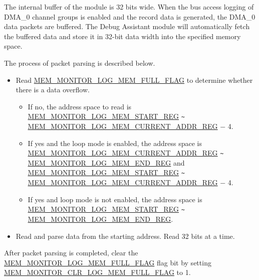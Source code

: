 \documentclass[main\_\_EN.tex]{subfiles}
\begin{document}
The internal buffer of the module is 32 bits wide. When the bus access logging of DMA\_0 channel groups is enabled and the record data is generated, the DMA\_0 data packets are buffered. The Debug Assistant module will automatically fetch the buffered data and store it in 32-bit data width into the specified memory space.

The process of packet parsing is described below.

\begin{itemize}
    \item Read \hyperref[fielddesc:MEMMONITORLOGMEMFULLFLAG]{MEM\_MONITOR\_LOG\_MEM\_FULL\_FLAG} to determine whether there is a data overflow.
    \begin{itemize} 
        \item If no, the address space to read is \hyperref[regdesc:MEMMONITORLOGMEMSTARTREG]{MEM\_MONITOR\_LOG\_MEM\_START\_REG}  \verb+~+ \hyperref[regdesc:MEMMONITORLOGMEMCURRENTADDRREG]{MEM\_MONITOR\_LOG\_MEM\_CURRENT\_ADDR\_REG} $-$ 4.
        \item If yes and the loop mode is enabled, the address space is \hyperref[regdesc:MEMMONITORLOGMEMCURRENTADDRREG]{MEM\_MONITOR\_LOG\_MEM\_CURRENT\_ADDR\_REG} \verb+~+ \hyperref[regdesc:MEMMONITORLOGMEMENDREG]{MEM\_MONITOR\_LOG\_MEM\_END\_REG} and \hyperref[regdesc:MEMMONITORLOGMEMSTARTREG]{MEM\_MONITOR\_LOG\_MEM\_START\_REG} \verb+~+ \hyperref[regdesc:MEMMONITORLOGMEMCURRENTADDRREG]{MEM\_MONITOR\_LOG\_MEM\_CURRENT\_ADDR\_REG} $-$ 4.
        \item If yes and loop mode is not enabled, the address space is \hyperref[regdesc:MEMMONITORLOGMEMSTARTREG]{MEM\_MONITOR\_LOG\_MEM\_START\_REG} \verb+~+ \hyperref[regdesc:MEMMONITORLOGMEMENDREG]{MEM\_MONITOR\_LOG\_MEM\_END\_REG}.
    \end{itemize}
    \item Read and parse data from the starting address. Read 32 bits at a time.
\end{itemize}

After packet parsing is completed, clear the \hyperref[fielddesc:MEMMONITORLOGMEMFULLFLAG]{MEM\_MONITOR\_LOG\_MEM\_FULL\_FLAG} flag bit by setting \hyperref[fielddesc:MEMMONITORCLRLOGMEMFULLFLAG]{MEM\_MONITOR\_CLR\_LOG\_MEM\_FULL\_FLAG} to 1.


\end{document}
